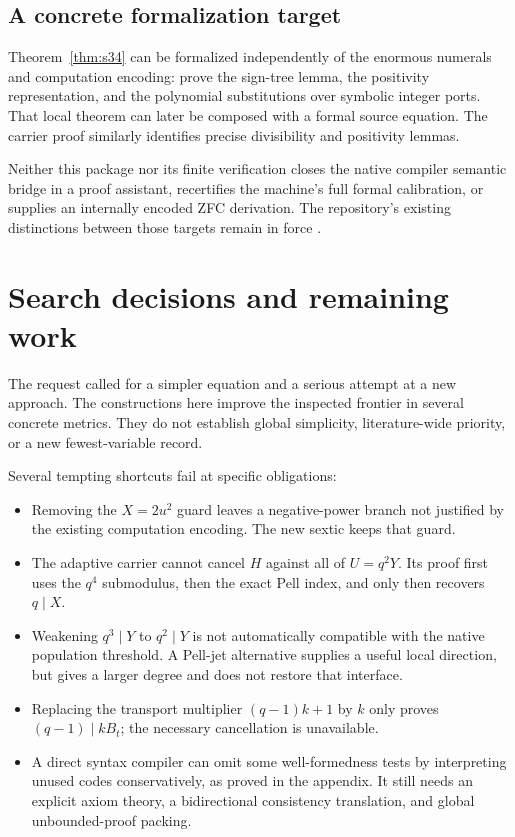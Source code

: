 \documentclass[11pt,a4paper]{article}
\theoremstyle{definition}
\begin{document}
\subsection{A concrete formalization target}

Theorem~\ref{thm:s34} can be formalized independently of the
enormous numerals and computation encoding: prove the
sign-tree lemma, the positivity representation, and the
polynomial substitutions over symbolic integer ports.
That local theorem can later be composed with a formal
source equation. The carrier proof similarly identifies
precise divisibility and positivity lemmas.

Neither this package nor its finite verification closes the
native compiler semantic bridge in a proof assistant, recertifies
the machine's full formal calibration, or supplies an internally
encoded ZFC derivation. The repository's existing distinctions
between those targets remain in force \cite{status}.

\section{Search decisions and remaining work}
\label{sec:limits}

The request called for a simpler equation and a serious attempt
at a new approach. The constructions here improve the inspected
frontier in several concrete metrics. They do not establish
global simplicity, literature-wide priority, or a new
fewest-variable record.

Several tempting shortcuts fail at specific obligations:
\begin{itemize}
\item Removing the \(X=2u^2\) guard leaves a negative-power
branch not justified by the existing computation encoding.
The new sextic keeps that guard.
\item The adaptive carrier cannot cancel \(H\) against all
of \(U=q^2Y\). Its proof first uses the \(q^4\) submodulus,
then the exact Pell index, and only then recovers \(q\mid X\).
\item Weakening \(q^3\mid Y\) to \(q^2\mid Y\) is not
automatically compatible with the native population threshold.
A Pell-jet alternative supplies a useful local direction,
but gives a larger degree and does not restore that interface.
\item Replacing the transport multiplier \((q-1)k+1\) by \(k\)
only proves \((q-1)\mid kB_t\); the necessary cancellation
is unavailable.
\item A direct syntax compiler can omit some well-formedness
tests by interpreting unused codes conservatively, as proved
in the appendix. It still needs an explicit axiom theory,
a bidirectional consistency translation, and global
unbounded-proof packing.
\end{itemize}
\end{document}
